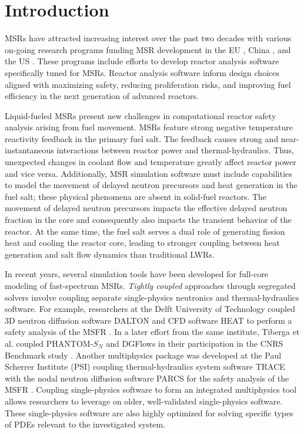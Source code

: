 \section{Introduction} \label{sec:intro}

\glspl{MSR} have attracted increasing interest over the past two
decades with various on-going research programs funding \gls{MSR} development
in the EU \citep{cordis_severe_nodate}, China \citep{dai_17_2017}, and the US
\citep{doe_office_2021}. These programs include efforts to develop
reactor analysis software specifically tuned for \glspl{MSR}. Reactor
analysis software inform design choices aligned with
maximizing safety, reducing proliferation risks, and improving fuel
efficiency in the next generation of advanced reactors.

Liquid-fueled \glspl{MSR} present new challenges in computational reactor
safety analysis arising from fuel movement. \glspl{MSR} feature strong
negative temperature reactivity feedback in the primary fuel salt. The feedback
causes strong and near-instantaneous
interactions between reactor power and thermal-hydraulics. Thus,
unexpected changes in coolant flow and temperature greatly affect reactor
power and vice versa. Additionally, \gls{MSR} simulation software must include
capabilities to model the movement of delayed neutron precursors
and heat generation in the fuel salt; these physical phenomena are
absent in solid-fuel reactors. The movement of delayed neutron precursors
impacts the effective delayed neutron fraction in the core and consequently
also impacts the transient behavior of the reactor. At the same time, the fuel
salt serves a dual role of generating fission heat and cooling the reactor
core, leading to stronger coupling between heat generation and salt flow
dynamics than traditional \glspl{LWR}.

In recent years, several simulation tools have been developed for full-core
modeling of fast-spectrum \glspl{MSR}. \textit{Tightly coupled} approaches
through segregated solvers involve coupling separate single-physics neutronics
and thermal-hydraulics software. For example, researchers at
the Delft University of Technology coupled 3D neutron diffusion software
DALTON \citep{boer_validation_2010} and CFD software HEAT
\citep{de_zwaan_static_2007} to perform a safety analysis of the \gls{MSFR}
\citep{fiorina_modelling_2014}. In a later effort from the same institute,
Tiberga et al. \cite{tiberga_discontinuous_2019} coupled PHANTOM-$S_N$ and
DGFlows in their participation in the
\gls{CNRS} Benchmark study \citep{tiberga_results_2020}. Another multiphysics
package was developed at the Paul Scherrer Institute (PSI) coupling
thermal-hydraulics system software \gls{TRACE} \citep{nrc_trace_2007} with the
nodal neutron diffusion software \gls{PARCS} \citep{downar_parcs_2010} for the
safety analysis of the \gls{MSFR} \citep{pettersen_coupled_2016}. Coupling
single-physics software to form an integrated multiphysics tool allows
researchers to leverage on older, well-validated single-physics software.
These single-physics software are also highly optimized for solving specific
types of \glspl{PDE} relevant to the investigated system.


